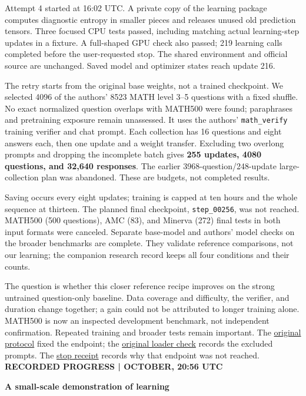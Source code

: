 \documentclass[11pt]{article}
\newcommand{\pagetitle}[2]{{\small\color{accent}\textbf{#1}}\par
  {\LARGE\color{ink}\textbf{#2}}\par\medskip}
\newcommand{\topic}[1]{\par\smallskip{\large\color{ink}\textbf{#1}}\par}
\newcommand{\code}[1]{\texttt{#1}}
\begin{document}
Attempt 4 started at 16:02 UTC. A private copy of the learning package
computes diagnostic entropy in smaller pieces and releases unused old prediction
tensors. Three focused CPU tests passed, including matching actual learning-step
updates in a fixture. A full-shaped GPU check also passed; 219 learning calls
completed before the user-requested stop. The shared environment and official
source are unchanged. Saved model and optimizer states reach update 216.

The retry starts from the original base weights, not a trained checkpoint.
We selected 4096 of the authors' 8523 MATH level 3--5 questions with a fixed
shuffle. No exact normalized question overlaps with MATH500 were found;
paraphrases and pretraining exposure remain unassessed.
It uses the authors' \code{math\_verify} training verifier and chat prompt.
Each collection has 16 questions and eight answers each, then one update and
a weight transfer. Excluding two overlong prompts and dropping the incomplete
batch gives \textbf{255 updates, 4080 questions, and 32,640 responses}.
The earlier 3968-question/248-update large-collection plan was abandoned.
These are budgets, not completed results.

Saving occurs every eight updates; training is capped at ten hours and the
whole sequence at thirteen. The planned final checkpoint, \code{step\_00256},
was not reached. MATH500 (500 questions), AMC (83), and Minerva (272) final tests
in both input formats were canceled. Separate base-model
and authors' model checks on the broader benchmarks are complete. They validate
reference comparisons, not our learning; the companion research record keeps
all four conditions and their counts.

\topic{What remains outside this demonstration}

The question is whether this closer reference recipe improves on the strong
untrained question-only baseline. Data coverage and difficulty, the verifier,
and duration change together; a gain could not be attributed to longer training
alone. MATH500 is now an inspected development benchmark, not independent
confirmation. Repeated training and broader tests remain important.
The \href{longer-training-plan.md}{original protocol} fixed the endpoint;
the \href{longer-loader-receipt.json}{original loader check} records the excluded prompts.
The \href{user-stop-2056.json}{stop receipt} records why that endpoint was not reached.
\newpage
\pagetitle{RECORDED PROGRESS \quad |  OCTOBER, 20:56 UTC}
  {A small-scale demonstration of learning}
\end{document}
